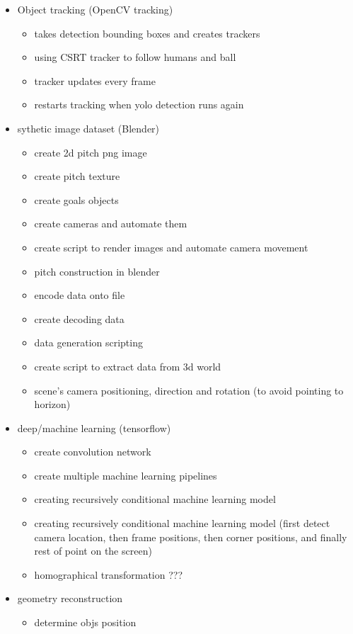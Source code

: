 \documentclass[
11pt,
twoside
]{report}
\begin{document}
\begin{itemize}
\item
  Object tracking (OpenCV tracking)

  \begin{itemize}
  \item
    takes detection bounding boxes and creates trackers
  \item
    using CSRT tracker to follow humans and ball
  \item
    tracker updates every frame
  \item
    restarts tracking when yolo detection runs again
  \end{itemize}

\item
  sythetic image dataset (Blender)

  \begin{itemize}
  \item
    create 2d pitch png image
  \item
    create pitch texture
  \item
    create goals objects
  \item
    create cameras and automate them
  \item
    create script to render images and automate camera movement
  \item
    pitch construction in blender
  \item
    encode data onto file
  \item
    create decoding data
  \item
    data generation scripting
  \item
    create script to extract data from 3d world
  \item
    scene's camera positioning, direction and rotation (to avoid
    pointing to horizon)
  \end{itemize}
\item
  deep/machine learning (tensorflow)

  \begin{itemize}
  \item
    create convolution network
  \item
    create multiple machine learning pipelines
  \item
    creating recursively conditional machine learning model
  \item
    creating recursively conditional machine learning model (first detect camera location, then frame positions, then corner positions, and finally rest of point on the screen)
  \item
    homographical transformation ???
  \end{itemize}

\item
    geometry reconstruction
    \begin{itemize}
        \item
        determine objs position
    \end{itemize}

\end{itemize}
\end{document}
